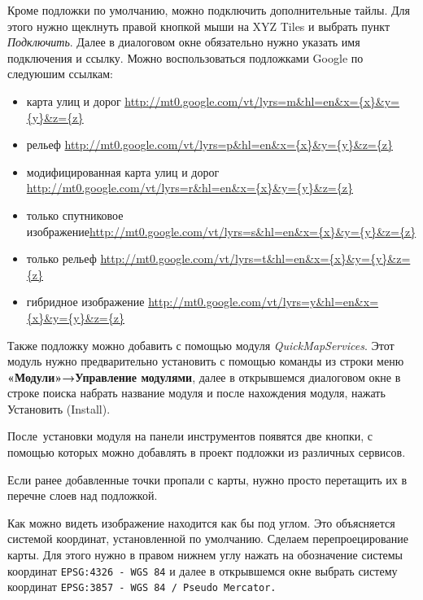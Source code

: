\documentclass[
]{book}
\begin{document}
Кроме подложки по умолчанию, можно подключить дополнительные тайлы. Для этого нужно щеклнуть правой кнопкой мыши на XYZ Tiles и выбрать пункт \emph{Подключить}. Далее в диалоговом окне обязательно нужно указать имя подключения и ссылку. Можно воспользоваться подложками Google по следуюшим ссылкам:

\begin{itemize}
\item
  карта улиц и дорог \protect\hyperlink{sentux2f_blank}{\underline{http://mt0.google.com/vt/lyrs=m\&hl=en\&x=\{x\}\&y=\{y\}\&z=\{z\}}}
\item
  рельеф \protect\hyperlink{sentux2f_blank}{http://mt0.google.com/vt/lyrs=p\&hl=en\&x=\{x\}\&y=\{y\}\&z=\{z\}}
\item
  модифицированная карта улиц и дорог \protect\hyperlink{sentux2f_blank}{http://mt0.google.com/vt/lyrs=r\&hl=en\&x=\{x\}\&y=\{y\}\&z=\{z\}}
\item
  только спутниковое изображение\protect\hyperlink{sentux2f_blank}{http://mt0.google.com/vt/lyrs=s\&hl=en\&x=\{x\}\&y=\{y\}\&z=\{z\}}
\item
  только рельеф \protect\hyperlink{sentux2f_blank}{http://mt0.google.com/vt/lyrs=t\&hl=en\&x=\{x\}\&y=\{y\}\&z=\{z\}}
\item
  гибридное изображение \protect\hyperlink{sentux2f_blank}{http://mt0.google.com/vt/lyrs=y\&hl=en\&x=\{x\}\&y=\{y\}\&z=\{z\}}
\end{itemize}

Также подложку можно добавить с помощью модуля \emph{QuickMapServices}. Этот модуль нужно предварительно установить с помощью команды из строки меню \textbf{«Модули»→Управление модулями}, далее в открывшемся диалоговом окне в строке поиска набрать название модуля и после нахождения модуля, нажать Установить (Install).

После~установки модуля на панели инструментов появятся две кнопки, с помощью которых можно добавлять в проект подложки из различных сервисов.

Если ранее добавленные точки пропали с карты, нужно просто перетащить их в перечне слоев над подложкой.

Как можно видеть изображение находится как бы под углом. Это объясняется системой координат, установленной по умолчанию. Сделаем перепроецирование карты. Для этого нужно в правом нижнем углу нажать на обозначение системы координат \texttt{EPSG:4326\ -\ WGS\ 84} и далее в открывшемся окне выбрать систему координат \texttt{EPSG:3857\ -\ WGS\ 84\ /\ Pseudo\ Mercator.}
\end{document}
